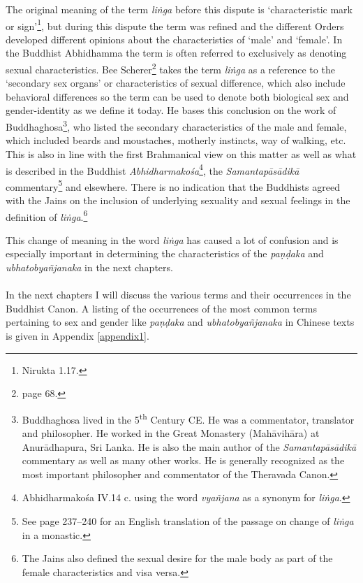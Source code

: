 The original meaning of the term {\em liṅga} before this dispute is `characteristic mark or sign'\footnote{Nirukta 1.17.}, but during this dispute the term was refined and the different Orders developed different opinions about the characteristics of `male' and `female'. In the Buddhist Abhidhamma the term is often referred to exclusively as denoting sexual characteristics. Bee Scherer\footnote{\cite{scherer} page 68.} takes the term {\em liṅga} as a reference to the `secondary sex organs' or characteristics of sexual difference, which also include behavioral differences so the term can be used to denote both biological sex and gender-identity as we define it today. He bases this conclusion on the work of Buddhaghosa\footnote{Buddhaghosa lived in the 5\textsuperscript{th} Century CE. He was a commentator, translator and philosopher. He worked in the Great Monastery (Mahāvihāra) at Anurādhapura, Sri Lanka. He is also the main author of the {\em Samantapāsādikā} commentary as well as many other works. He is generally recognized as the most important philosopher and commentator of the Theravada Canon.}, who listed the secondary characteristics of the male and female, which included beards and moustaches, motherly instincts, way of walking, etc. This is also in line with the first Brahmanical view on this matter as well as what is described in the Buddhist {\em Abhidharmakośa}\footnote{Abhidharmakośa IV.14 c. using the word {\em vyañjana} as a synonym for {\em liṅga}.}, the {\em Samantapāsādikā} commentary\footnote{See \cite{anderson2016} page 237–240 for an English translation of the passage on change of {\em liṅga} in a monastic.} and elsewhere. There is no indication that the Buddhists agreed with the Jains on the inclusion of underlying sexuality and sexual feelings in the definition of {\em liṅga}.\footnote{The Jains also defined the sexual desire for the male body as part of the female characteristics and visa versa.}

This change of meaning in the word {\em liṅga} has caused a lot of confusion and is especially important in determining the characteristics of the {\em paṇḍaka} and {\em ubhatob­yañ­janaka} in the next chapters.\\
\\
In the next chapters I will discuss the various terms and their occurrences in the Buddhist Canon. A listing of the occurrences of the most common terms pertaining to sex and gender like {\em paṇḍaka} and {\em ubhatob­yañ­janaka} in Chinese texts is given in Appendix \ref{appendix1}. 
